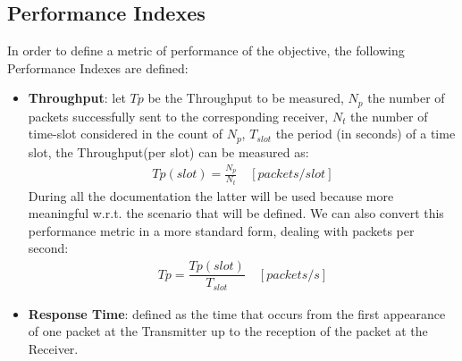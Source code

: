 \subsection{Performance Indexes}
In order to define a metric of performance of the objective, the following Performance Indexes are defined:
\begin{itemize}
	\item \textbf{Throughput}: let $Tp$ be the Throughput to be measured, $N_{p}$ the number of packets successfully sent to the corresponding receiver, $N_{t}$ the number of time-slot considered in the count of $N_{p}$, $T_{slot}$ the period (in seconds) of a time slot, the Throughput(per slot) can be measured as:
	\begin{align*}
	Tp(slot) = \frac{N_{p}}{N_{t}} \quad [packets/slot]
	\end{align*}
	During all the documentation the latter will be used because more meaningful w.r.t. the scenario that will be defined.
	We can also convert this performance metric in a more standard form, dealing with packets per second:
	\begin{align*}
	Tp = \dfrac{Tp(slot)}{T_{slot}} \quad [packets/s]
	\end{align*}
	
	
	\item \textbf{Response Time}: defined as the time that occurs from the first appearance of one packet at the Transmitter up to the reception of the packet at the Receiver.
	
\end{itemize}